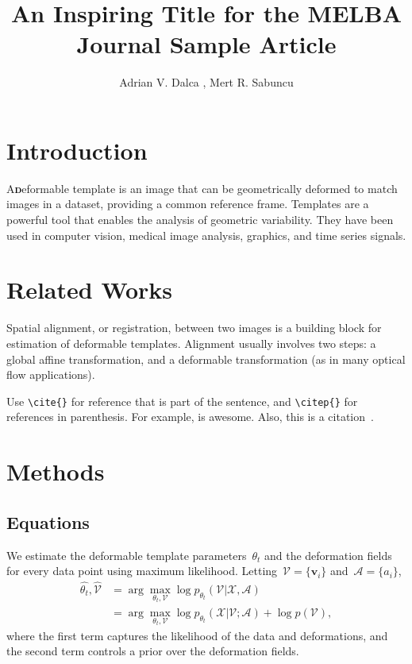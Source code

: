 \documentclass[accepted]{melba}
\title{An Inspiring Title for the MELBA Journal Sample Article}
\author{
	\firstname Adrian V. \surname Dalca \aff{1,3},
	\name Mert R. Sabuncu\orcid{0000-0002-7068-719X} \aff{2,3}
}
\newcommand{\enluminure}[2]{\lettrine[lines=3]{%
\textcolor{melba}{#1}}{\bfseries\textcolor{black}{#2}}}
\begin{document}
\twocolumn[\maketitle]

\vspace{1em}

\section{Introduction}
	\enluminure{A} deformable template is an image that can be geometrically deformed to match images in a dataset, providing a common reference frame. Templates are a powerful tool that enables the analysis of geometric variability. They have been used in computer vision, medical image analysis, graphics, and time series signals.


\section{Related Works}
	Spatial alignment, or registration, between two images is a building block for estimation of deformable templates. Alignment usually involves two steps: a global affine transformation, and a deformable transformation (as in many optical flow applications).

	Use \verb|\cite{}| for reference that is part of the sentence, and \verb|\citep{}| for references in parenthesis. For example, \cite{viola1997alignment} is awesome. Also, this is a citation~\citep{viola1997alignment}.



\section{Methods}
	\subsection{Equations}
		We estimate the deformable template parameters~$\theta_t$ and the deformation fields for every data point using maximum likelihood. Letting~$\mathcal{V} = \{\boldsymbol{v}_i\}$ and~$\mathcal{A} = \{a_i\}$,
		\begin{align}
			\hat{\theta_t}, \hat{\mathcal{V}} &= \arg \max_{\theta_t, \mathcal{V}} \log p_{\theta_t}(\mathcal{V} | \mathcal{X},  \mathcal{A}) \nonumber \\
			&= \arg \max_{\theta_t, \mathcal{V}} \log p_{\theta_t}(\mathcal{X} | \mathcal{V}; \mathcal{A}) + \log p(\mathcal{V}),
			\label{eq:logpost}
		\end{align}
		where the first term captures the likelihood of the data and deformations, and the second term controls a prior over the deformation fields.
\end{document}
